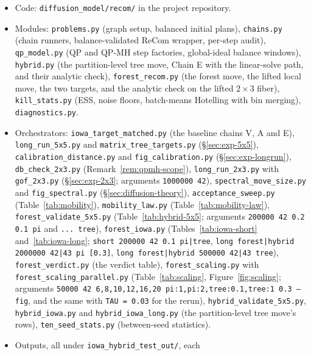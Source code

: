 \documentclass[11pt]{article}
\begin{document}
\begingroup
\raggedright
\begin{itemize}
  \item Code: \texttt{diffusion\_model/recom/} in the project
    repository.
  \item Modules: \texttt{problems.py} (graph setup, balanced initial
    plans), \texttt{chains.py} (chain runners, balance-validated
    ReCom wrapper, per-step audit), \texttt{qp\_model.py}
    (QP and QP-MH step factories, global-ideal balance windows),
    \texttt{hybrid.py} (the partition-level tree move, Chain E with
    the linear-solve path, and their analytic check),
    \texttt{forest\_recom.py} (the forest move, the lifted local move,
    the two targets, and the analytic check on the lifted
    $2 \times 3$ fiber), \texttt{kill\_stats.py} (ESS, noise floors,
    batch-means Hotelling with bin merging), \texttt{diagnostics.py}.
  \item Orchestrators: \texttt{iowa\_target\_matched.py} (the
    baseline chains V, A and E), \texttt{long\_run\_5x5.py} and
    \texttt{matrix\_tree\_targets.py} (\S\ref{sec:exp-5x5}),
    \texttt{calibration\_distance.py} and \texttt{fig\_calibration.py}
    (\S\ref{sec:exp-longrun}), \texttt{db\_check\_2x3.py}
    (Remark~\ref{rem:qpmh-scope}), \texttt{long\_run\_2x3.py} with
    \texttt{gof\_2x3.py} (\S\ref{sec:exp-2x3}; arguments
    \texttt{1000000 42}), \texttt{spectral\_move\_size.py} and
    \texttt{fig\_spectral.py} (\S\ref{sec:diffusion-theory}),
    \texttt{acceptance\_sweep.py} (Table~\ref{tab:mobility}),
    \texttt{mobility\_law.py} (Table~\ref{tab:mobility-law}),
    \texttt{forest\_validate\_5x5.py} (Table~\ref{tab:hybrid-5x5};
    arguments \texttt{200000 42 0.2 0.1 pi} and \texttt{... tree}),
    \texttt{forest\_iowa.py} (Tables~\ref{tab:iowa-short}
    and~\ref{tab:iowa-long}; \texttt{short 200000 42 0.1 pi|tree},
    \texttt{long forest|hybrid 2000000 42|43 pi [0.3]},
    \texttt{long forest|hybrid 500000 42|43 tree}),
    \texttt{forest\_verdict.py} (the verdict table),
    \texttt{forest\_scaling.py} with \texttt{forest\_scaling\_parallel.py}
    (Table~\ref{tab:scaling}, Figure~\ref{fig:scaling}; arguments
    \texttt{50000 42 6,8,10,12,16,20 pi:1,pi:2,tree:0.1,tree:1 0.3
    --fig}, and the same with \texttt{TAU = 0.03} for the rerun),
    \texttt{hybrid\_validate\_5x5.py}, \texttt{hybrid\_iowa.py} and
    \texttt{hybrid\_iowa\_long.py} (the partition-level tree move's
    rows), \texttt{ten\_seed\_stats.py} (between-seed statistics).
  \item Outputs, all under \texttt{iowa\_hybrid\_test\_out/}, each

\end{itemize}
\end{document}
